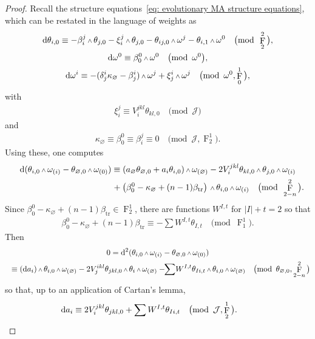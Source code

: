 \documentclass[10pt,a4paper]{amsart}
\DeclareMathOperator{\tr}{tr}
\renewcommand{\d}{{\rm d}}
\renewcommand{\mod}[1]{\quad\big(\mathrm{mod\enspace} #1\big)}
\newcommand{\w}{{\mathchoice{\,{\scriptstyle\wedge}\,}{{\scriptstyle\wedge}}
 {{\scriptscriptstyle\wedge}}{{\scriptscriptstyle\wedge}}}}
\newcommand{\thetas}[1]{\theta_{#1}}
\newcommand{\thetanot}{\thetas{\varnothing,0}}
\newcommand{\omegas}[1]{\omega_{(#1)}}
\DeclareMathOperator{\pwf}{F}
\newcommand{\cartTheta}{\mathcal{J}}
\numberwithin{equation}{section}
\begin{document}
\begin{proof}
Recall the structure equations~\eqref{eq: evolutionary MA structure equations}, which can be restated in the language of weights as
\begin{gather*}
\d\thetas{i,0} \equiv -\beta_i^j\w\thetas{j,0} - \xi_i^j\w\thetas{j,0} - \thetas{ij,0}\w\omega^j - \thetas{i,1}\w\omega^0 \mod{\pwf^2_2},\\
\d\omega^0 \equiv \beta_0^0\w\omega^0 \mod{\omega^0 }, \\
\d\omega^i \equiv - (\delta^i_j\kappa_{\varnothing} - \beta^i_j)\w\omega^j + \xi^i_j\w\omega^j \mod{\omega^0, \pwf^1_0} ,
\end{gather*}
with
\begin{gather*}
\xi_i^j \equiv V_i^{jkl}\thetas{kl,0} \mod{\cartTheta}
\end{gather*}
and
\begin{gather*}
\kappa_\varnothing \equiv \beta_0^0 \equiv \beta_i^j \equiv 0 \mod{\cartTheta, \pwf^1_2} .
\end{gather*}
Using these, one computes
\begin{gather*}
 \d(\thetas{i,0}\w\omegas{i} - \thetanot\w\omegas{0})
 \equiv (a_\varnothing\thetanot + a_i\thetas{i,0})\w\omegas{\varnothing} - 2V_i^{jkl}\thetas{kl,0}\w\thetas{j,0}\w\omegas{i}
 \\ \hphantom{ \d(\thetas{i,0}\w\omegas{i} - \thetanot\w\omegas{0}) \equiv }
 {} + \left(\beta_0^0 -\kappa_{\varnothing} + (n-1)\beta_{\tr}\right)\w\thetas{i,0}\w\omegas{i} \mod{\pwf^2_{2-n}}.
\end{gather*}
Since $\beta_0^0 -\kappa_{\varnothing} + (n-1)\beta_{\tr} \in \pwf^1_2$, there are functions $W^{I,t}$ for $|I|+t = 2$ so that
\begin{gather*}
\beta_0^0 -\kappa_{\varnothing} + (n-1)\beta_{\tr} \equiv -\sum W^{I,t}\thetas{I,t} \mod{\pwf^1_1} .
\end{gather*}
Then
\begin{gather*}
 0 = \d^2(\thetas{i,0}\w\omegas{i} - \thetanot\w\omegas{0})
 \\ \hphantom{ 0 }
 {}\equiv (\d a_i)\w\thetas{i,0}\w\omegas{\varnothing} - 2V_j^{ikl}\thetas{jkl,0}\w\thetas{i}\w\omegas{\varnothing}
 -\!\! \sum\! W^{I,t}\thetas{Ii,t}\w\thetas{i,0}\w\omegas{\varnothing}\mod{\thetanot, \pwf^2_{2-n}}
\end{gather*}
so that, up to an application of Cartan's lemma,
\begin{gather*}
\d a_i \equiv 2V_i^{jkl}\thetas{jkl,0} + \sum W^{I,t}\thetas{Ii,t} \mod{\cartTheta, \pwf^1_2} .
\tag*{\qed}
\end{gather*}
\renewcommand{\qed}{}
\end{proof}
\end{document}
